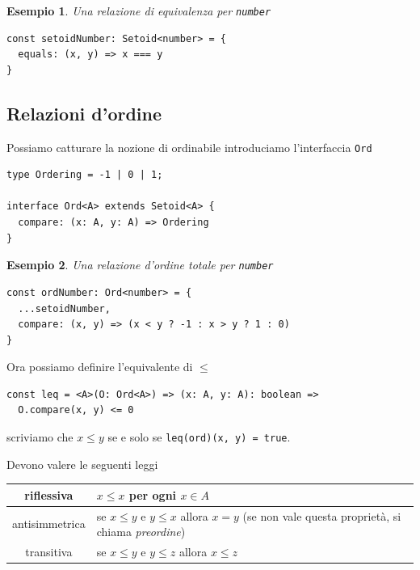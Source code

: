 \documentclass[12pt]{article}
\newtheorem{example}{Esempio}[section]
\begin{document}
\begin{example}
Una relazione di equivalenza per \texttt{number}
\begin{verbatim}
const setoidNumber: Setoid<number> = {
  equals: (x, y) => x === y
}
\end{verbatim}
\end{example}

\subsection{Relazioni d'ordine}

Possiamo catturare la nozione di ordinabile introduciamo l'interfaccia \texttt{Ord}

\begin{verbatim}
type Ordering = -1 | 0 | 1;

interface Ord<A> extends Setoid<A> {
  compare: (x: A, y: A) => Ordering
}
\end{verbatim}

\begin{example}
Una relazione d'ordine totale per \texttt{number}

\begin{verbatim}
const ordNumber: Ord<number> = {
  ...setoidNumber,
  compare: (x, y) => (x < y ? -1 : x > y ? 1 : 0)
}
\end{verbatim}
\end{example}

Ora possiamo definire l'equivalente di $\leq$

\begin{verbatim}
const leq = <A>(O: Ord<A>) => (x: A, y: A): boolean =>
  O.compare(x, y) <= 0
\end{verbatim}

scriviamo che $x \leq y$ se e solo se \texttt{leq(ord)(x, y) = true}.

Devono valere le seguenti leggi

\begin{center}
\bgroup
\def\arraystretch{1.5}
\begin{tabular}{ |c|p{10cm}| }
\hline
riflessiva & $x \leq x$ per ogni $x \in A$ \\
\hline
antisimmetrica & se $x \leq y$ e $y \leq x$ allora $x = y$ (se non vale questa proprietà, si chiama \emph{preordine}) \\
\hline
transitiva & se $x \leq y$ e $y \leq z$ allora $x \leq z$ \\
\hline
\end{tabular}
\egroup
\end{center}
\end{document}

